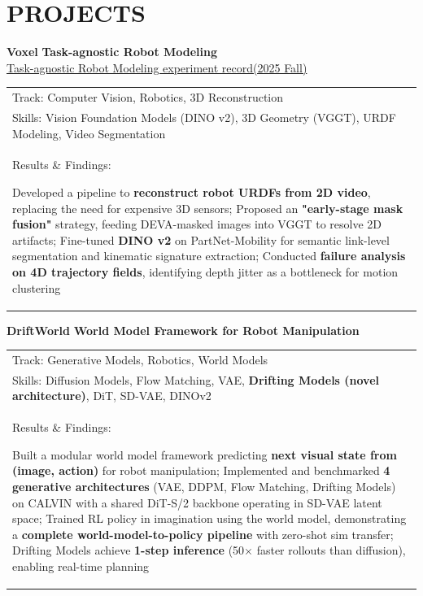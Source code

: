 \documentclass[a4paper,9pt]{extarticle}
\begin{document}
\section*{PROJECTS}
    \textbf{\Large Voxel}
    \textbf{\Large Task-agnostic Robot Modeling} \\
    \href{https://github.com/JacobGIT2/TraceAnything/blob/main/Task_agnostic_Robot_Modeling_experiment_record__2025_Fall_.pdf}{Task-agnostic Robot Modeling experiment record(2025 Fall)} \\
    \vspace{2pt} 
    \noindent
    \begin{tabular}{@{$\circ$\hspace{0.5em}} l}
        Track: Computer Vision, Robotics, 3D Reconstruction \\
        Skills: Vision Foundation Models (DINO v2), 3D Geometry (VGGT), URDF Modeling, Video Segmentation \\
        Results \& Findings:
        \parbox[t]{0.85\textwidth}
        {Developed a pipeline to \textbf{reconstruct robot URDFs from 2D video}, replacing the need for expensive 3D sensors;
        Proposed an \textbf{"early-stage mask fusion"} strategy, feeding DEVA-masked images into VGGT to resolve 2D artifacts;
        Fine-tuned \textbf{DINO v2} on PartNet-Mobility for semantic link-level segmentation and kinematic signature extraction;
        Conducted \textbf{failure analysis on 4D trajectory fields}, identifying depth jitter as a bottleneck for motion clustering}
    \end{tabular}
    \textbf{\Large DriftWorld}
    \textbf{\Large World Model Framework for Robot Manipulation} \\
    \vspace{2pt}
    \noindent
    \begin{tabular}{@{$\circ$\hspace{0.5em}} l}
        Track: Generative Models, Robotics, World Models \\
        Skills: Diffusion Models, Flow Matching, VAE, \textbf{Drifting Models (novel architecture)}, DiT, SD-VAE, DINOv2 \\
        Results \& Findings:
        \parbox[t]{0.85\textwidth}
        {Built a modular world model framework predicting \textbf{next visual state from (image, action)} for robot manipulation;
        Implemented and benchmarked \textbf{4 generative architectures} (VAE, DDPM, Flow Matching, Drifting Models)
        on CALVIN with a shared DiT-S/2 backbone operating in SD-VAE latent space;
        Trained RL policy in imagination using the world model, demonstrating a
        \textbf{complete world-model-to-policy pipeline} with zero-shot sim transfer;
        Drifting Models achieve \textbf{1-step inference} (50$\times$ faster rollouts than diffusion), enabling real-time planning}
    \end{tabular}
\end{document}
